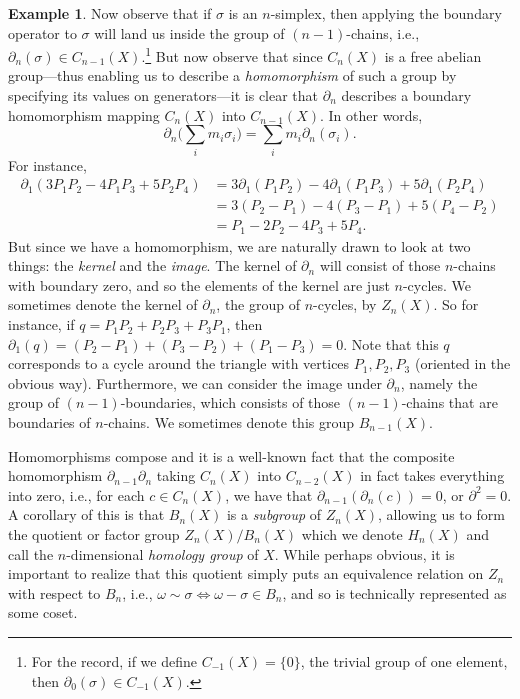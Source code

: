 \documentclass[11pt]{book}
\theoremstyle{definition}
\newtheorem{example}{Example}[section]
\theoremstyle{definition}
\theoremstyle{definition}
\theoremstyle{theorem}
\theoremstyle{definition}
\begin{document}
\begin{example}
	Now observe that if $\sigma$ is an $n$-simplex, then applying the boundary operator to $\sigma$ will land us inside the group of $(n-1)$-chains, i.e., $\partial_n(\sigma) \in C_{n-1}(X)$.\footnote{For the record, if we define $C_{-1}(X) = \{0\}$, the trivial group of one element, then $\partial_0(\sigma) \in C_{-1}(X)$.} But now observe that since $C_n(X)$ is a free abelian group---thus enabling us to describe a \textit{homomorphism} of such a group by specifying its values on generators---it is clear that $\partial_n$ describes a boundary homomorphism mapping $C_n(X)$ into $C_{n-1}(X)$. In other words, 
	\begin{equation}
	\partial_n \Big(\sum_i m_i \sigma_i \Big) = \sum_i m_i \partial_n (\sigma_i).
	\end{equation}
	For instance, 	 
	\begin{align*}
	\partial_1(3P_1P_2 - 4P_1P_3 + 5P_2P_4) & =  3 \partial_1 (P_1P_2) - 4\partial_1(P_1P_3) + 5\partial_1(P_2P_4) \\
	& = 3(P_2-P_1) -4(P_3-P_1) + 5(P_4-P_2) \\
	& = P_1 - 2P_2 - 4P_3 + 5P_4. 
	\end{align*} 
	But since we have a homomorphism, we are naturally drawn to look at two things: the \textit{kernel} and the \textit{image}. The kernel of $\partial_n$ will consist of those $n$-chains with boundary zero, and so the elements of the kernel are just $n$-cycles. We sometimes denote the kernel of $\partial_n$, the group of $n$-cycles, by $Z_n(X)$. So for instance, if $q = P_1P_2 + P_2P_3 +P_3P_1$, then $\partial_1(q) = (P_2 - P_1) + (P_3 - P_2) + (P_1 - P_3) = 0$. Note that this $q$ corresponds to a cycle around the triangle with vertices $P_1, P_2,P_3$ (oriented in the obvious way). Furthermore, we can consider the image under $\partial_n$, namely the group of $(n-1)$-boundaries, which consists of those $(n-1)$-chains that are boundaries of $n$-chains. We sometimes denote this group $B_{n-1}(X)$.\par 
	Homomorphisms compose and it is a well-known fact that the composite homomorphism $\partial_{n-1}\partial_{n}$ taking $C_n(X)$ into $C_{n-2}(X)$ in fact takes everything into zero, i.e., for each $c \in C_n(X)$, we have that $\partial_{n-1}(\partial_n(c)) = 0$, or $\partial^2 = 0$. A corollary of this is that $B_n(X)$ is a \textit{subgroup} of $Z_n(X)$, allowing us to form the quotient or factor group $Z_n(X)/B_n(X)$ which we denote $H_n(X)$ and call the $n$-dimensional \textit{homology group} of $X$. While perhaps obvious, it is important to realize that this quotient simply puts an equivalence relation on $Z_n$ with respect to $B_n$, i.e., $\omega \sim \sigma \iff \omega - \sigma \in B_n$, and so is technically represented as some coset. \par 

\end{example}
\end{document}
